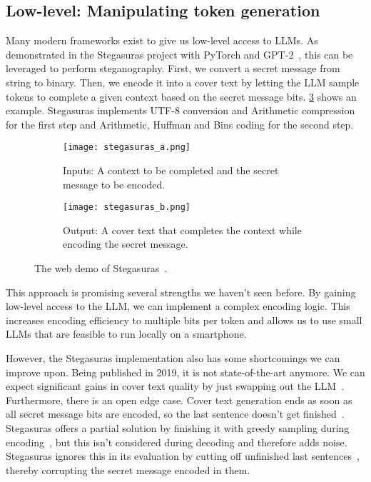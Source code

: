 \subsection{Low-level: Manipulating token generation}
\label{sec:lowLevelManipulatingTokenGeneration}
Many modern frameworks exist to give us low-level access to \glspl{LLM}. As demonstrated in the Stegasuras project with PyTorch and GPT-2~\cite{zieglerNeuralLinguisticSteganography2019,zieglerHarvardnlpNeuralSteganography2025,zieglerStegasuras2025}, this can be leveraged to perform steganography. First, we convert a secret message from string to binary. Then, we encode it into a cover text by letting the \gls{LLM} sample tokens to complete a given context based on the secret message bits. \cref{fig:stegasuras} shows an example. Stegasuras implements UTF-8 conversion and Arithmetic compression for the first step and Arithmetic, Huffman and Bins coding for the second step.

\begin{figure}
	\captionsetup{width=\linewidth}

	\begin{subfigure}{\linewidth}
		\centering
		\texttt{[image: stegasuras\_a.png]}
		\caption{Inputs: A context to be completed and the secret message to be encoded.}
		\label{fig:stegasurasA}
	\end{subfigure}

	\begin{subfigure}{\linewidth}
		\centering
		\texttt{[image: stegasuras\_b.png]}
		\caption{Output: A cover text that completes the context while encoding the secret message.}
		\label{fig:stegasurasB}
	\end{subfigure}

	\caption[Stegasuras]{The web demo of Stegasuras~\cite{zieglerStegasuras2025}.}
	\label{fig:stegasuras}
\end{figure}

This approach is promising several strengths we haven't seen before. By gaining low-level access to the \gls{LLM}, we can implement a complex encoding logic. This increases encoding efficiency to multiple bits per token and allows us to use small \glspl{LLM} that are feasible to run locally on a smartphone.

However, the Stegasuras implementation also has some shortcomings we can improve upon. Being published in 2019, it is not state-of-the-art anymore. We can expect significant gains in cover text quality by just swapping out the \gls{LLM}~\cite{wuGenerativeTextSteganography2024}. Furthermore, there is an open edge case. Cover text generation ends as soon as all secret message bits are encoded, so the last sentence doesn't get finished~\cite{zieglerStegasuras2025}. Stegasuras offers a partial solution by finishing it with greedy sampling during encoding~\cite{zieglerHarvardnlpNeuralSteganography2025}, but this isn't considered during decoding and therefore adds noise. Stegasuras ignores this in its evaluation by cutting off unfinished last sentences~\cite{zieglerNeuralLinguisticSteganography2019}, thereby corrupting the secret message encoded in them.

